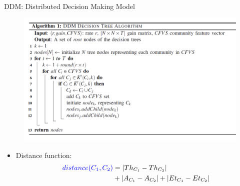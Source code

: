 \documentclass{beamer}
\begin{document}
\begin{frame}{DDM: Distributed Decision Making Model}
    \begin{figure}[htbp]
        \centering
        \includegraphics[scale=0.26]{figures/alg.png}
    \end{figure}

    \footnotesize
    \begin{itemize}
    \item Distance function:
        \begin{equation*}\label{distance_c}
            \begin{split}
                {\color{blue}distance (C_1, C_2)} & = |Th_{C_1} - Th_{C_2}| \\
                                & + |A_{C_1} - A_{C_2}| + |Et_{C_1} - Et_{C_2}|
            \end{split}
        \end{equation*}
    \end{itemize}
\end{frame}
\end{document}

